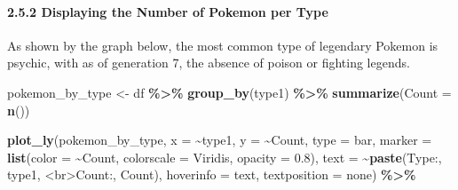 \documentclass[
]{article}
\newenvironment{Shaded}{\begin{snugshade}}{\end{snugshade}}
\newcommand{\AttributeTok}[1]{\textcolor[rgb]{0.13,0.29,0.53}{#1}}
\newcommand{\FloatTok}[1]{\textcolor[rgb]{0.00,0.00,0.81}{#1}}
\newcommand{\FunctionTok}[1]{\textcolor[rgb]{0.13,0.29,0.53}{\textbf{#1}}}
\newcommand{\NormalTok}[1]{#1}
\newcommand{\OtherTok}[1]{\textcolor[rgb]{0.56,0.35,0.01}{#1}}
\newcommand{\SpecialCharTok}[1]{\textcolor[rgb]{0.81,0.36,0.00}{\textbf{#1}}}
\newcommand{\StringTok}[1]{\textcolor[rgb]{0.31,0.60,0.02}{#1}}
\begin{document}
\paragraph{2.5.2 Displaying the Number of Pokemon per
Type}\label{displaying-the-number-of-pokemon-per-type}

As shown by the graph below, the most common type of legendary Pokemon
is psychic, with as of generation 7, the absence of poison or fighting
legends.

\begin{Shaded}
\begin{Highlighting}[]
\NormalTok{pokemon\_by\_type }\OtherTok{\textless{}{-}}\NormalTok{ df }\SpecialCharTok{\%\textgreater{}\%}
  \FunctionTok{group\_by}\NormalTok{(type1) }\SpecialCharTok{\%\textgreater{}\%}
  \FunctionTok{summarize}\NormalTok{(}\AttributeTok{Count =} \FunctionTok{n}\NormalTok{())}

\FunctionTok{plot\_ly}\NormalTok{(pokemon\_by\_type, }\AttributeTok{x =} \SpecialCharTok{\textasciitilde{}}\NormalTok{type1, }\AttributeTok{y =} \SpecialCharTok{\textasciitilde{}}\NormalTok{Count,}
        \AttributeTok{type =} \StringTok{\textquotesingle{}bar\textquotesingle{}}\NormalTok{,}
        \AttributeTok{marker =} \FunctionTok{list}\NormalTok{(}\AttributeTok{color =} \SpecialCharTok{\textasciitilde{}}\NormalTok{Count, }\AttributeTok{colorscale =} \StringTok{\textquotesingle{}Viridis\textquotesingle{}}\NormalTok{, }\AttributeTok{opacity =} \FloatTok{0.8}\NormalTok{),}
        \AttributeTok{text =} \SpecialCharTok{\textasciitilde{}}\FunctionTok{paste}\NormalTok{(}\StringTok{\textquotesingle{}Type:\textquotesingle{}}\NormalTok{, type1, }\StringTok{\textquotesingle{}\textless{}br\textgreater{}Count:\textquotesingle{}}\NormalTok{, Count),}
        \AttributeTok{hoverinfo =} \StringTok{\textquotesingle{}text\textquotesingle{}}\NormalTok{,}
        \AttributeTok{textposition =} \StringTok{\textquotesingle{}none\textquotesingle{}}\NormalTok{) }\SpecialCharTok{\%\textgreater{}\%}


\end{Highlighting}
\end{Shaded}
\end{document}
